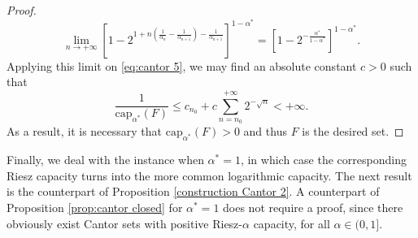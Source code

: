\documentclass[12pt]{amsart}
\theoremstyle{definition}\newtheorem{remark}[theorem]{Remark}
\theoremstyle{definition}\newtheorem{example}[theorem]{Example}
\theoremstyle{definition}\newtheorem{definition}{Definition}
\numberwithin{equation}{section}
\begin{document}
\begin{proof}
\begin{equation*}
        \lim_{n\to+\infty}\left[1-2^{1+n\left(\frac{1}{\alpha_n}-\frac{1}{\alpha_{n+1}}\right)-\frac{1}{\alpha_{n+1}}}\right]^{1-\alpha^*}=\left[1-2^{-\frac{\alpha^*}{1-\alpha^*}}\right]^{1-\alpha^*}.
    \end{equation*}
    Applying this limit on \eqref{eq:cantor 5}, we may find an absolute constant $c>0$ such that
    \begin{equation*}
        \frac{1}{\mathrm{cap}_{\alpha^*}(F)} \le c_{n_0}+c\sum_{n=n_0}^{+\infty}2^{-\sqrt{n}}<+\infty.
    \end{equation*}
    As a result, it is necessary that $\mathrm{cap}_{\alpha^*}(F)>0$ and thus $F$ is the desired set.
\end{proof}



Finally, we deal with the instance when $\alpha^*=1$, in which case the corresponding Riesz capacity turns into the more common logarithmic capacity. The next result is the counterpart of Proposition \ref{construction Cantor 2}. A counterpart of Proposition \ref{prop:cantor closed} for $\alpha^*=1$ does not require a proof, since there obviously exist Cantor sets with positive Riesz-$\alpha$ capacity, for all $\alpha\in(0,1]$.
\end{document}
